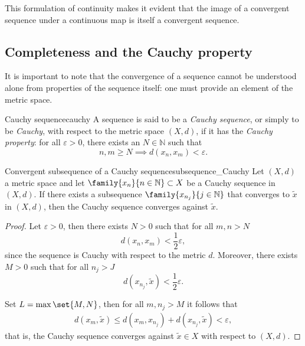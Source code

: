 \begin{remark}
    This formulation of continuity makes it evident that the image of a convergent sequence under a continuous map is itself a convergent sequence.
\end{remark}

\subsection{Completeness and the Cauchy property}
It is important to note that the convergence of a sequence cannot be understood alone from properties of the sequence itself: one must provide an element of the metric space.
\begin{definition}{Cauchy sequence}{cauchy}
    A sequence  is said to be a \emph{Cauchy sequence}, or simply to be \emph{Cauchy}, with respect to the metric space \((X, d)\), if it has the \emph{Cauchy property}: for all \(\varepsilon > 0\), there exists an \(N \in \mathbb{N}\) such that
    \begin{equation*}
        n,m \geq N \implies d(x_n, x_m) < \varepsilon.
    \end{equation*}
\end{definition}

\begin{proposition}{Convergent subsequence of a Cauchy sequence}{subsequence_Cauchy}
    Let \((X, d)\) a metric space and let \(\family{x_n}{n \in \mathbb{N}}\subset X\) be a Cauchy sequence in \((X,d)\). If there exists a subsequence \(\family{x_{n_j}}{j \in \mathbb{N}}\) that converges to \(\tilde{x}\) in \((X, d)\), then the Cauchy sequence converges against \(\tilde{x}\).
\end{proposition}
\begin{proof}
    Let \(\varepsilon > 0\), then there exists \(N > 0\) such that for all \(m, n > N\)
    \begin{equation*}
        d(x_n, x_m) < \frac12 \varepsilon,
    \end{equation*}
    since the sequence is Cauchy with respect to the metric \(d\). Moreover, there exists \(M > 0\) such that for all \(n_j > J\)
    \begin{equation*}
        d(x_{n_j}, \tilde{x}) < \frac12 \varepsilon.
    \end{equation*}

    Set \(L = \max\set{M,N}\), then for all \(m, n_j > M\) it follows that
    \begin{align*}
        d(x_m, \tilde{x}) \leq d(x_m, x_{n_j}) + d(x_{n_j}, \tilde{x}) < \varepsilon,
    \end{align*}
    that is, the Cauchy sequence converges against \(\tilde{x} \in X\) with respect to \((X,d)\).
\end{proof}

